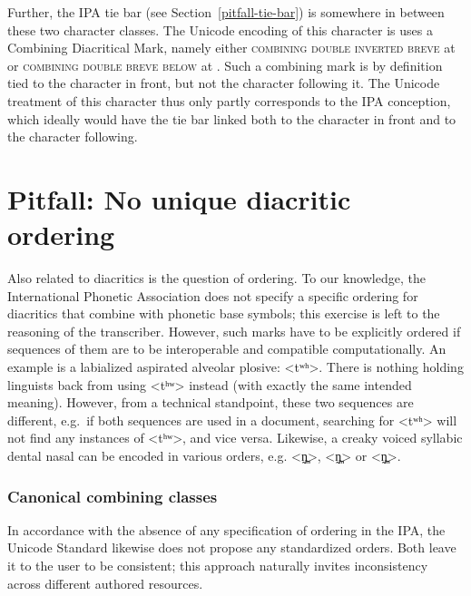 Further, the IPA tie bar (see Section~\ref{pitfall-tie-bar}) is somewhere in
between these two character classes. The Unicode encoding of this character is
uses a Combining Diacritical Mark, namely either \textsc{combining double
inverted breve} at  or \textsc{combining double breve below} at
. Such a combining mark is by definition tied to the character in
front, but not the character following it. The Unicode treatment of this
character thus only partly corresponds to the IPA conception, which ideally
would have the tie bar linked both to the character in front and to the 
character following.

\section{Pitfall: No unique diacritic ordering}
\label{pitfall-no-unique-diacritic-ordering}

Also related to diacritics is the question of ordering. To our knowledge, the
International Phonetic Association does not specify a specific ordering for
diacritics that combine with phonetic base symbols; this exercise is left to the
reasoning of the transcriber. However, such marks have to be explicitly ordered
if sequences of them are to be interoperable and compatible computationally. An example is a
labialized aspirated alveolar plosive: <tʷʰ>. There is nothing holding linguists
back from using <tʰʷ> instead (with exactly the same intended meaning). However,
from a technical standpoint, these two sequences are different, e.g.~if both
sequences are used in a document, searching for <tʷʰ> will not find any
instances of <tʰʷ>, and vice versa. Likewise, a creaky voiced syllabic dental
nasal can be encoded in various orders, e.g. <n̪̰̩>, <n̩̰̪> or <n̩̪̰>.

\subsubsection*{Canonical combining classes}

In accordance with the absence of any specification of ordering in the IPA, the
Unicode Standard likewise does not propose any standardized orders. Both leave it
to the user to be consistent; this approach naturally invites inconsistency across 
different authored resources.

